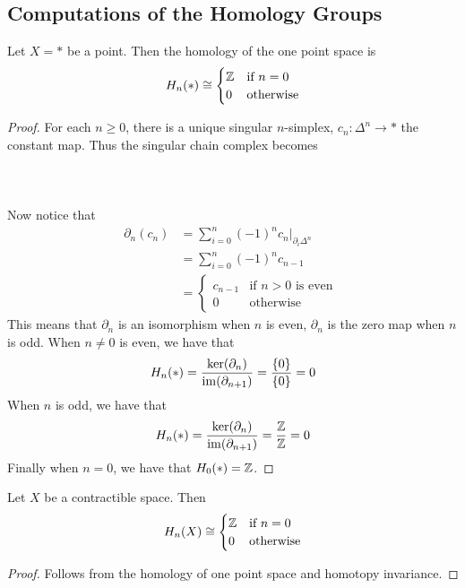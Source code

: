 \documentclass[a4paper]{article}
\begin{document}
\subsection{Computations of the Homology Groups}
\begin{prp}{}{} Let $X=\ast$ be a point. Then the homology of the one point space is $$H_n(\ast)\cong\begin{cases}
\mathbb{Z} & \text{if } n=0\\
0 & \text{otherwise}
\end{cases}$$ \tcbline
\begin{proof}
For each $n\geq 0$, there is a unique singular $n$-simplex, $c_n:\Delta^n\to\ast$ the constant map. Thus the singular chain complex becomes \\~\\
\\~\\
Now notice that 
\begin{align*}
\partial_n(c_n)&=\sum_{i=0}^n(-1)^nc_n|_{\partial_i\Delta^n}\\
&=\sum_{i=0}^n(-1)^nc_{n-1}\\
&=\begin{cases}
c_{n-1} & \text{if } n>0\text{ is even }\\
0 & \text{otherwise }
\end{cases}
\end{align*}
This means that $\partial_n$ is an isomorphism when $n$ is even, $\partial_n$ is the zero map when $n$ is odd. When $n\neq 0$ is even, we have that $$H_n(\ast)=\frac{\ker(\partial_n)}{\operatorname{im}(\partial_{n+1})}=\frac{\{0\}}{\{0\}}=0$$ When $n$ is odd, we have that $$H_n(\ast)=\frac{\ker(\partial_n)}{\operatorname{im}(\partial_{n+1})}=\frac{\mathbb{Z}}{\mathbb{Z}}=0$$ Finally when $n=0$, we have that $H_0(\ast)=\mathbb{Z}$. 
\end{proof}
\end{prp}

\begin{crl}{}{} Let $X$ be a contractible space. Then $$H_n(X)\cong\begin{cases}
\mathbb{Z} & \text{if } n=0\\
0 & \text{otherwise}
\end{cases}$$ \tcbline
\begin{proof}
Follows from the homology of one point space and homotopy invariance. 
\end{proof}
\end{crl}
\end{document}
